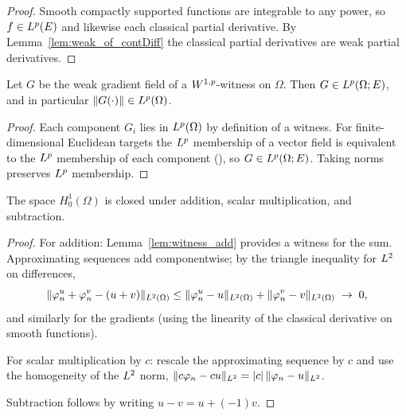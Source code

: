 \begin{proof}
\leanok
{}

Smooth compactly supported functions are integrable to any power, so $f \in
L^{p}(E)$ and likewise each classical partial derivative. By
Lemma~\ref{lem:weak_of_contDiff} the classical partial derivatives are weak
partial derivatives.
\end{proof}

\begin{lemma}
\label{lem:weak_grad_norm_memLp}
\leanok
{}
Let $G$ be the weak gradient field of a $W^{1,p}$-witness on $\Omega$. Then
$G \in L^{p}(\Omega; E)$, and in particular $\|G(\cdot)\| \in L^{p}(\Omega)$.
\end{lemma}

\begin{proof}
\leanok

Each component $G_i$ lies in $L^{p}(\Omega)$ by definition of a witness. For
finite-dimensional Euclidean targets the $L^{p}$ membership of a vector field
is equivalent to the $L^{p}$ membership of each component
(), so $G \in L^{p}(\Omega; E)$. Taking norms
preserves $L^{p}$ membership.
\end{proof}

\begin{proposition}
\label{prop:H01_vector_space}
\leanok
{}
The space $H_0^1(\Omega)$ is closed under addition, scalar multiplication, and
subtraction.
\end{proposition}

\begin{proof}
\leanok
{}

For addition: Lemma~\ref{lem:witness_add} provides a witness for the sum.
Approximating sequences add componentwise; by the triangle inequality for
$L^{2}$ on differences,
\begin{equation*}
  \|\varphi_n^u + \varphi_n^v - (u+v)\|_{L^{2}(\Omega)}
  \le \|\varphi_n^u - u\|_{L^{2}(\Omega)} + \|\varphi_n^v - v\|_{L^{2}(\Omega)}
  \;\to\; 0,
\end{equation*}
and similarly for the gradients (using the linearity of the classical
derivative on smooth functions).

For scalar multiplication by $c$: rescale the approximating sequence by $c$ and
use the homogeneity of the $L^{2}$ norm,
$\|c\varphi_n - c u\|_{L^{2}} = |c|\,\|\varphi_n - u\|_{L^{2}}$.

Subtraction follows by writing $u - v = u + (-1)v$.
\end{proof}

